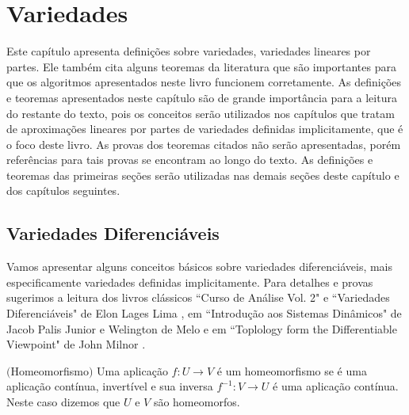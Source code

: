 \chapter{Variedades}\label{cap_var}

\thispagestyle{empty}

Este capítulo apresenta definições sobre variedades, variedades lineares por partes. Ele também cita alguns teoremas da literatura que são importantes para que os algoritmos apresentados neste livro funcionem corretamente. 
As definições e teoremas apresentados neste capítulo são de grande importância para a leitura do restante do texto, pois os conceitos serão utilizados nos capítulos que tratam de aproximações lineares por partes de variedades definidas implicitamente, que é o foco deste livro.
As provas dos teoremas citados não serão apresentadas, porém referências para tais provas se encontram ao longo do texto.
As definições e teoremas das primeiras seções serão utilizadas nas demais seções deste capítulo e dos capítulos seguintes.


\section{Variedades Diferenciáveis}\label{var_dif}

Vamos apresentar alguns conceitos básicos sobre variedades diferenciáveis, mais especificamente variedades definidas implicitamente. 
Para detalhes e provas sugerimos a leitura dos livros clássicos  ``Curso de Análise Vol. 2" \cite{elon_an} e ``Variedades Diferenciáveis" de Elon Lages Lima \cite{elon}, em ``Introdução aos Sistemas Dinâmicos" de Jacob Palis Junior  e Welington de Melo \cite{jacob} e em ``Toplology form the Differentiable Viewpoint"  de John Milnor \cite{Mi}.

\begin{defi} $($Homeomorfismo$)$
Uma aplicação $f : U \rightarrow V$ é um homeomorfismo se é uma aplicação contínua, invertível e sua inversa $f^{-1} : V \rightarrow U$ é uma aplicação contínua.
Neste caso dizemos que $U$ e $V$ são homeomorfos.
\end{defi}

